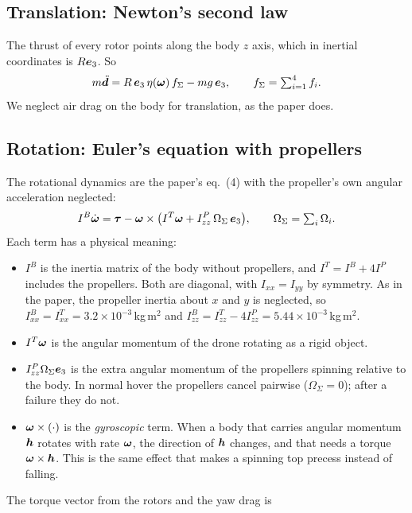 \subsection{Translation: Newton's second law}
The thrust of every rotor points along the body $z$ axis, which in inertial coordinates is $R\boldsymbol{e}_3$. So
\begin{equation}\label{eq:trans}
  m\ddot{\boldsymbol{d}} = R\,\boldsymbol{e}_3\,\eta(\boldsymbol{\omega})\,f_\Sigma - mg\,\boldsymbol{e}_3, \qquad f_\Sigma = \textstyle\sum_{i=1}^4 f_i .
\end{equation}
We neglect air drag on the body for translation, as the paper does.

\subsection{Rotation: Euler's equation with propellers}
The rotational dynamics are the paper's eq.~(4) with the propeller's own angular acceleration neglected:
\begin{equation}\label{eq:rot}
  I^B\dot{\boldsymbol{\omega}} = \boldsymbol{\tau} - \boldsymbol{\omega}\times\big(I^T\boldsymbol{\omega} + I^P_{zz}\,\Omega_\Sigma\,\boldsymbol{e}_3\big), \qquad \Omega_\Sigma = \textstyle\sum_i \Omega_i .
\end{equation}
Each term has a physical meaning:
\begin{itemize}
  \item $I^B$ is the inertia matrix of the body without propellers, and $I^T = I^B + 4I^P$ includes the propellers. Both are diagonal, with $I_{xx}=I_{yy}$ by symmetry. As in the paper, the propeller inertia about $x$ and $y$ is neglected, so $I^B_{xx} = I^T_{xx} = 3.2\times10^{-3}$\,kg\,m$^2$ and $I^B_{zz} = I^T_{zz} - 4I^P_{zz} = 5.44\times10^{-3}$\,kg\,m$^2$.
  \item $I^T\boldsymbol{\omega}$ is the angular momentum of the drone rotating as a rigid object.
  \item $I^P_{zz}\Omega_\Sigma\boldsymbol{e}_3$ is the extra angular momentum of the propellers spinning relative to the body. In normal hover the propellers cancel pairwise ($\Omega_\Sigma = 0$); after a failure they do not.
  \item $\boldsymbol{\omega}\times(\cdot)$ is the \emph{gyroscopic} term. When a body that carries angular momentum $\boldsymbol{h}$ rotates with rate $\boldsymbol{\omega}$, the direction of $\boldsymbol{h}$ changes, and that needs a torque $\boldsymbol{\omega}\times\boldsymbol{h}$. This is the same effect that makes a spinning top precess instead of falling.
\end{itemize}
The torque vector from the rotors and the yaw drag is
